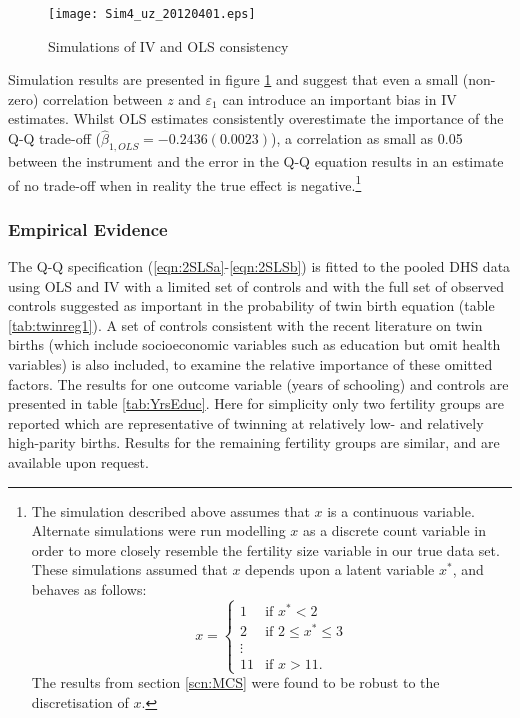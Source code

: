 \documentclass{article}[11pt,subeqn]
\begin{document}
\begin{spacing}{1.5}
\begin{figure}[!htbp]
\caption{Simulations of IV and OLS consistency}
\label{fig:MC}
\begin{center}
\vspace{-4mm}
\texttt{[image: Sim4\_uz\_20120401.eps]}
\end{center}
\end{figure}


Simulation results are presented in figure \ref{fig:MC} and suggest that even a small (non-zero) correlation between $z$ and $\varepsilon_1$ can introduce an 
important bias in IV estimates.  Whilst OLS estimates consistently overestimate the importance of the Q-Q trade-off ($\hat{\beta}_{1,OLS}=-0.2436 (0.0023)$), a correlation
as small as 0.05 between the instrument and the error in the Q-Q equation results in an estimate of no trade-off when in reality the true effect is negative.\footnote{The
simulation described above assumes that $x$ is a continuous variable.  Alternate simulations were run modelling $x$ as a discrete count variable in order to more closely resemble 
the fertility size variable in our true data set.  These simulations assumed that $x$ depends upon a latent variable $x^*$, and behaves as follows:
\[ x = \left\{ \begin{array}{ll}
         1 & \mbox{if $x^* < 2$}\\
         2 & \mbox{if $2\leq x^* \leq 3$}\\
        \vdots & \\
        11 & \mbox{if $x > 11$}.\end{array} \right. \]
 The results from section \ref{scn:MCS} were found to be robust to the discretisation of $x$.
}
\subsubsection{Empirical Evidence}
\label{scn:EE}
The Q-Q specification (\ref{eqn:2SLSa}-\ref{eqn:2SLSb}) is fitted to the pooled DHS data using OLS and IV with a limited set of controls and with the full set of observed 
controls suggested as important in the probability of twin birth equation (table \ref{tab:twinreg1}).  A set of controls consistent with the recent literature on twin 
births (which include socioeconomic variables such as education but omit health variables) is also included, to examine the relative importance of these omitted factors.  
The results for one outcome variable (years of schooling) and controls are presented in table \ref{tab:YrsEduc}.  Here for simplicity only two fertility groups are reported 
which are representative of twinning at relatively low- and relatively high-parity births.  Results for the remaining fertility groups are similar, and are available upon 
request.



\end{spacing}
\end{document}
